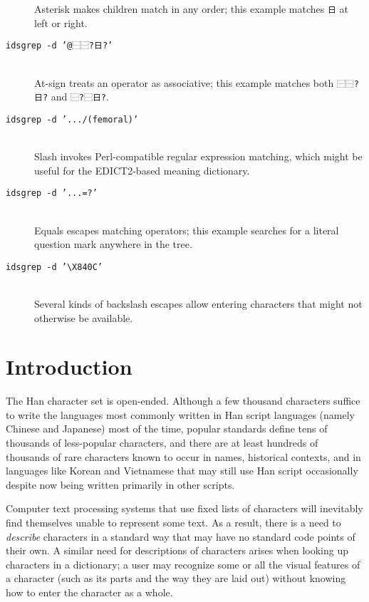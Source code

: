 \documentclass[twocolumn]{report}
\begin{document}
\begin{description}
  Asterisk makes children match in any order; this example matches
  \texttt{日} at left or right.
\item[\texttt{idsgrep -d '@⿱⿱?日?'}]~\\
  At-sign treats an operator as associative; this example matches both
  \texttt{⿱⿱?日?} and \texttt{⿱?⿱日?}.
\item[\texttt{idsgrep -d '.../(femoral)'}]~\\
  Slash invokes Perl-compatible regular expression matching, which might be
  useful for the EDICT2-based meaning dictionary.
\item[\texttt{idsgrep -d '...=?'}]~\\
  Equals escapes matching operators; this example searches for a literal
  question mark anywhere in the tree. 
\item[\texttt{idsgrep -d '\textbackslash X840C'}]~\\
  Several kinds of backslash escapes allow entering characters that might
  not otherwise be available.
\end{description}


\chapter{Introduction}

\noindent
The Han character set is open-ended.  Although a few thousand characters
suffice to write the languages most commonly written in Han script languages
(namely Chinese and Japanese) most of the time, popular standards define
tens of thousands of less-popular characters, and there are at least
hundreds of thousands of rare characters known to occur in names, historical
contexts, and in languages like Korean and Vietnamese that may still use Han
script occasionally despite now being written primarily in other scripts.

Computer text processing systems that use fixed lists of characters will
inevitably find themselves unable to represent some text.  As a result,
there is a need to \emph{describe} characters in a standard way that may
have no standard code points of their own.  A similar need for descriptions
of characters arises when looking up characters in a dictionary; a user may
recognize some or all the visual features of a character (such as its parts
and the way they are laid out) without knowing how to enter the character as
a whole.
\end{document}
